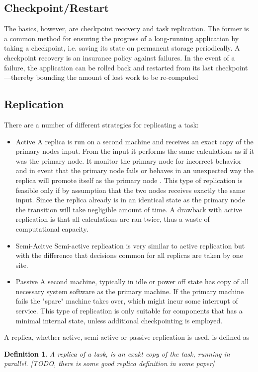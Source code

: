 \documentclass{cslthse-msc}
\newtheorem{definition}{Definition}[chapter]
\begin{document}
\subsection{Checkpoint/Restart}
The basics, however, are checkpoint recovery and task replication. The former is a common method for ensuring the progress of a long-running application by taking a checkpoint, i.e. saving its state on permanent storage periodically. A checkpoint recovery is an insurance policy against failures. In the event of a failure, the application can be rolled back and restarted from its last checkpoint—thereby bounding the amount of lost work to be re-computed \cite{effTaskReplMobGrid}

\subsection{Replication}
There are a number of different strategies for replicating a task:
\begin{itemize}
\item Active A replica is run on a second machine and receives an exact copy of the primary nodes input. From the input it performs the same calculations as if it was the primary node. It monitor the primary node for incorrect behavior and in event that the primary node fails or behaves in an unexpected way the replica will promote itself as the primary node \cite{surveyFaultParallel}. This type of replication is feasible only if by assumption that the two nodes receives exactly the same input. Since the replica already is in an identical state as the primary node the transition will take negligible amount of time. A drawback with active replication is that all calculations are ran twice, thus a waste of computational capacity. 
\item Semi-Acitve Semi-active replication is very similar to active replication but with the difference that decisions common for all replicas are taken by one site. 
\item Passive A second machine, typically in idle or power off state has  copy of all necessary system software as the primary machine. If the primary machine fails the "spare" machine takes over, which might incur some interrupt of service. This type of replication is only suitable for components that has a minimal internal state, unless additional checkpointing is employed. 
\end{itemize}

A replica, whether active, semi-active or passive replication is used, is defined as
\begin{definition} \label{def:replica}
A replica of a task, is an exakt copy of the task, running in parallel. [TODO, there is some good replica definition in some paper]
\end{definition}
\end{document}
